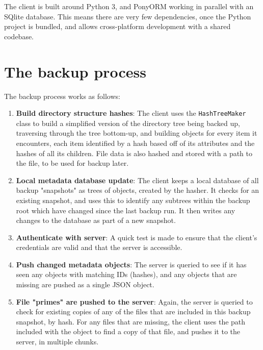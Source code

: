 \documentclass[bsc,frontabs,twoside,singlespacing,parskip,deptreport]{infthesis}     %
\begin{document}
The client is built around Python 3, and PonyORM working in parallel with an SQlite database. 
This means there are very few dependencies, once the Python project is bundled, and allows
cross-platform development with a shared codebase.

\section{The backup process}

The backup process works as follows:

\begin{enumerate}
	\item \textbf{Build directory structure hashes}:
	The client uses the \texttt{HashTreeMaker} class to build a simplified version of the 
	directory tree being backed up, traversing through the tree bottom-up, and building objects
	for every item it encounters, each item identified by a hash based off of its attributes
	and the hashes of all its children. File data is also hashed and stored with a path to the
	file, to be used for backup later.
	
	\item \textbf{Local metadata database update}:
	The client keeps a local database of all backup "snapshots" as trees of objects, created by
	the hasher. It checks for an existing snapshot, and uses this to identify any subtrees within
	the backup root which have changed since the last backup run. It then writes any changes to
	the database as part of a new snapshot.
	
	\item \textbf{Authenticate with server}:
	A quick test is made to ensure that the client's credentials are valid and that the server is
	accessible.
	
	\item \textbf{Push changed metadata objects}:
	The server is queried to see if it has seen any objects with matching IDs (hashes), and any
	objects that are missing are pushed as a single JSON object.
	
	\item \textbf{File "primes" are pushed to the server}:
	Again, the server is queried to check for existing copies of any of the files that are 
	included in this backup snapshot, by hash. For any files that are missing, the client uses
	the path included with the object to find a copy of that file, and pushes it to the server,
	in multiple chunks.
\end{enumerate}
\end{document}
